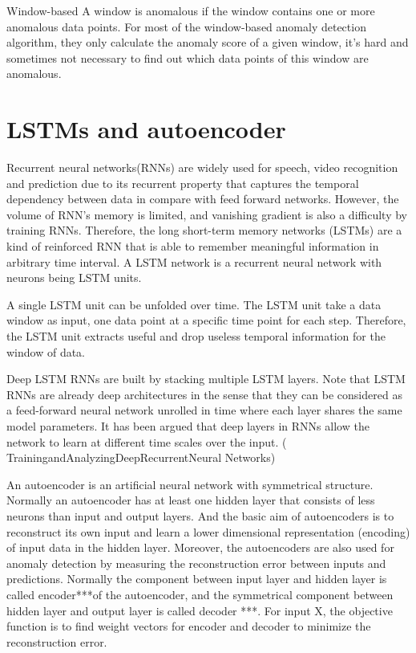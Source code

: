 Window-based
A window is anomalous if the window contains one or more anomalous data points. For most of the window-based anomaly detection algorithm, they only calculate the anomaly score of a given window, it’s hard and sometimes not necessary to find out which data points of this window are anomalous.

\section{LSTMs and autoencoder}
\label{sec:LSTMs and autoencoder}

Recurrent neural networks(RNNs) are widely used for speech, video recognition and prediction due to its recurrent property that captures the temporal dependency between data in compare with feed forward networks. However, the volume of RNN’s memory is limited, and vanishing gradient is also a difficulty by training RNNs. Therefore, the long short-term memory networks (LSTMs) are a kind of reinforced RNN that is able to remember meaningful information in arbitrary time interval. A LSTM network is a recurrent neural network with neurons being LSTM units.


A single LSTM unit can be unfolded over time. The LSTM unit take a data window as input, one data point at a specific time point for each step. Therefore, the LSTM unit extracts useful and drop useless temporal information for the window of data.
	
Deep LSTM RNNs are built by stacking multiple LSTM layers. Note that LSTM RNNs are already deep architectures in the sense that they can be considered as a feed-forward neural network unrolled in time where each layer shares the same model parameters. It has been argued that deep layers in RNNs allow the network to learn at different time scales over the input. ( TrainingandAnalyzingDeepRecurrentNeural Networks)

An autoencoder is an artificial neural network with symmetrical structure. Normally an autoencoder has at least one hidden layer that consists of less neurons than input and output layers. And the basic aim of autoencoders is to reconstruct its own input and learn a lower dimensional representation (encoding) of input data in the hidden layer. Moreover, the autoencoders are also used for anomaly detection by measuring the reconstruction error between inputs and predictions.
Normally the component between input layer and hidden layer is called encoder***of the autoencoder, and the symmetrical component between hidden layer and output layer is called decoder ***. For input X, the objective function is to find weight vectors for encoder and decoder to minimize the reconstruction error.
	 
 

